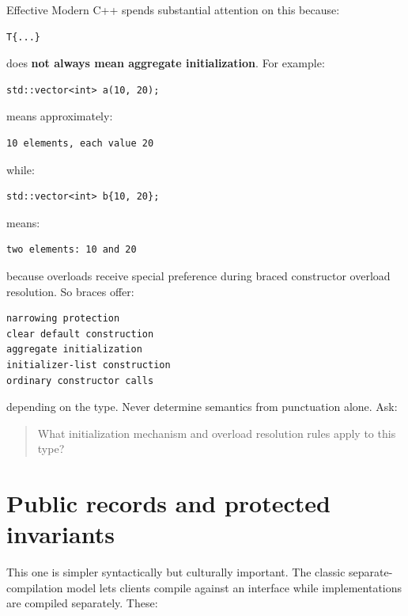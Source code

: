 Effective Modern C++ spends substantial attention on this because:

\begin{verbatim}
T{...}
\end{verbatim}

does \textbf{not always mean aggregate initialization}. For example:

\begin{verbatim}
std::vector<int> a(10, 20);
\end{verbatim}

means approximately:

\begin{verbatim}
10 elements, each value 20
\end{verbatim}

while:

\begin{verbatim}
std::vector<int> b{10, 20};
\end{verbatim}

means:

\begin{verbatim}
two elements: 10 and 20
\end{verbatim}

because  overloads receive special preference during braced constructor overload resolution. So braces offer:

\begin{verbatim}
narrowing protection
clear default construction
aggregate initialization
initializer-list construction
ordinary constructor calls
\end{verbatim}

depending on the type. Never determine semantics from punctuation alone. Ask:

\begin{quote}
What initialization mechanism and overload resolution rules apply to this type?
\end{quote}

\section{Public records and protected invariants}\label{05-engine-i-ch003-public-records-and-protected-invariants}

\hypertarget{05-engine-i-ch003-public-records-and-protected-invariants}{}

This one is simpler syntactically but culturally important. The classic separate-compilation model lets clients compile against an interface while implementations are compiled separately. These:

